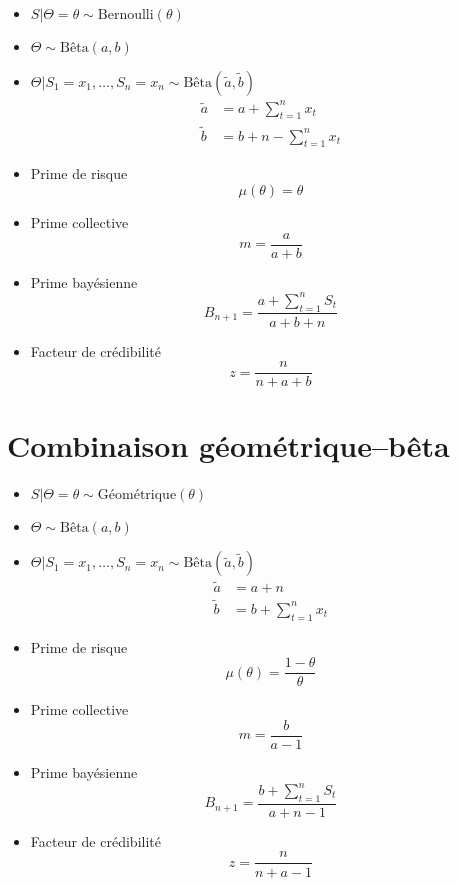 \begin{itemize}
\item $S|\Theta = \theta \sim \text{Bernoulli}(\theta)$
\item $\Theta \sim \text{Bêta}(a, b)$
\item $\Theta|S_1 = x_1, \dots, S_n = x_n \sim \text{Bêta}(\tilde{a},
  \tilde{b})$
  \begin{align*}
    \tilde{a} &= a + \sum_{t = 1}^n x_t \\
    \tilde{b} &= b + n - \sum_{t = 1}^n x_t
  \end{align*}
\item Prime de risque
  \begin{equation*}
    \mu(\theta) = \theta
  \end{equation*}
\item Prime collective
  \begin{equation*}
    m = \frac{a}{a + b}
  \end{equation*}
\item Prime bayésienne
  \begin{equation*}
    B_{n + 1} = \frac{a + \sum_{t = 1}^n S_t}{a + b + n}
  \end{equation*}
\item Facteur de crédibilité
  \begin{equation*}
    z = \frac{n}{n + a + b}
  \end{equation*}
\end{itemize}


\section{Combinaison géométrique--bêta}

\begin{itemize}
\item $S|\Theta = \theta \sim \text{Géométrique}(\theta)$
\item $\Theta \sim \text{Bêta}(a, b)$
\item $\Theta|S_1 = x_1, \dots, S_n = x_n \sim
  \text{Bêta}(\tilde{a}, \tilde{b})$
  \begin{align*}
    \tilde{a} &= a + n \\
    \tilde{b} &= b + \sum_{t = 1}^n x_t
  \end{align*}
\item Prime de risque
  \begin{equation*}
    \mu(\theta) = \frac{1 - \theta}{\theta}
  \end{equation*}
\item Prime collective
  \begin{equation*}
    m = \frac{b}{a - 1}
  \end{equation*}
\item Prime bayésienne
  \begin{equation*}
    B_{n + 1} = \frac{b + \sum_{t = 1}^n S_t}{a + n - 1}
  \end{equation*}
\item Facteur de crédibilité
  \begin{equation*}
    z = \frac{n}{n + a - 1}
  \end{equation*}
\end{itemize}

